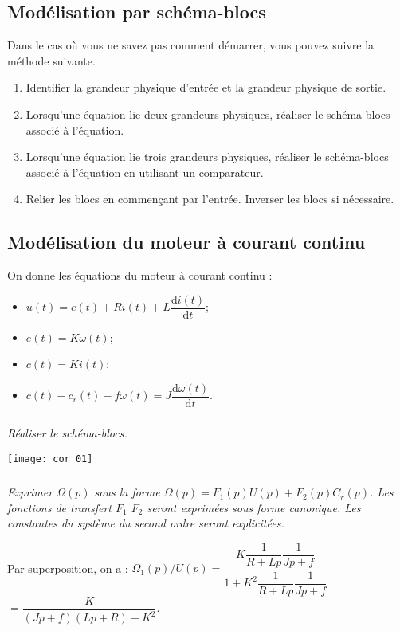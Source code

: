\begin{multicols}{2}
\section*{Modélisation par schéma-blocs}

\begin{methode}
Dans le cas où vous ne savez pas comment démarrer, vous pouvez suivre la méthode suivante.
\begin{enumerate}
\item Identifier la grandeur physique d'entrée et la grandeur physique de sortie.
\item Lorsqu'une équation lie deux grandeurs physiques, réaliser le schéma-blocs associé à l'équation. 
\item Lorsqu'une équation lie trois grandeurs physiques, réaliser le schéma-blocs associé à l'équation en utilisant un comparateur.
\item Relier les blocs en commençant par l'entrée. Inverser les blocs si nécessaire.
\end{enumerate}
\end{methode}
\subsection*{Modélisation du moteur à courant continu}
On donne les équations du moteur à courant continu :
\begin{itemize}
\item $u(t) = e(t)+ Ri(t) +L \dfrac{\text{d}i(t)}{\text{d} t}$;
\item $e(t)=K\omega(t)$;
\item $c(t)=Ki(t)$;
\item $c(t)-c_r(t) - f\omega(t)=J\dfrac{\text{d}\omega(t)}{\text{d} t}$.
\end{itemize}
\subparagraph{}
\textit{Réaliser le schéma-blocs.}

\ifprof
\begin{corrige}
\begin{center}
\texttt{[image: cor\_01]}
\end{center}
\end{corrige}
\else
\fi

\subparagraph{}
\textit{Exprimer $\Omega(p)$ sous la forme  $\Omega(p)=F_1(p)U(p) + F_2(p) C_r(p)$. Les fonctions de transfert $F_1$ $F_2$ seront exprimées sous forme canonique. Les constantes du système du second ordre seront explicitées.}
\ifprof
\begin{corrige}
Par superposition, on a : 
$\Omega_1(p)/U(p)=\dfrac{K\dfrac{1}{R+Lp}\dfrac{1}{Jp+f}}{1+K^2\dfrac{1}{R+Lp}\dfrac{1}{Jp+f}}$
$=\dfrac{K}{\left(Jp+f\right)\left(Lp+R\right)+K^2}$.


\end{corrige}
\end{multicols}

